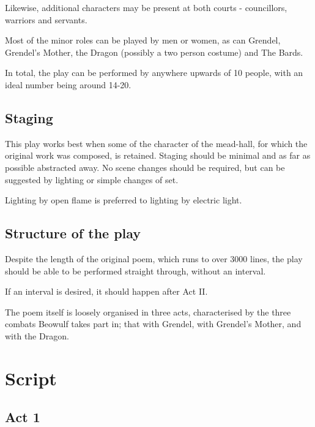 \documentclass[a4paper]{article}
\begin{document}
Likewise, additional characters may be present at both courts - councillors, warriors and servants.

Most of the minor roles can be played by men or women, as can Grendel, Grendel's
Mother, the Dragon (possibly a two person costume) and The Bards.

In total, the play can be performed by anywhere upwards of 10 people, with an ideal number being around 14-20.

\subsection{Staging}%

This play works best when some of the character of the mead-hall, for which the
original work was composed, is retained. Staging should be minimal and as far as
possible abstracted away. No scene changes should be required, but can be suggested 
by lighting or simple changes of set.

Lighting by open flame is preferred to lighting by electric light.

\subsection{Structure of the play}%

Despite the length of the original poem, which runs to over 3000 lines, the play
should be able to be performed straight through, without an interval.

If an interval is desired, it should happen after Act II.

The poem itself is loosely organised in three acts, characterised by the three 
combats Beowulf takes part in; that with Grendel, with Grendel's Mother, and with the Dragon.

\newpage

\section{Script}

\subsection{Act 1}%
\end{document}
